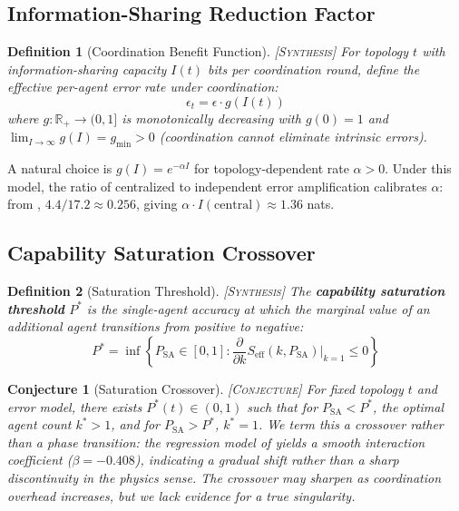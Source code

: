 \documentclass[11pt, a4paper, logo, copyright]{googledeepmind}
\newtheorem{definition}{Definition}[section]
\newtheorem{conjecture}[theorem]{Conjecture}
\newcommand{\synthesis}{\textsc{[Synthesis]}}
\newcommand{\conjectured}{\textsc{[Conjecture]}}
\begin{document}
\subsection{Information-Sharing Reduction Factor}

\begin{definition}[Coordination Benefit Function] \synthesis{}
\label{def:coord-benefit}
For topology $t$ with information-sharing capacity $I(t)$ bits per coordination round, define the effective per-agent error rate under coordination:
\begin{equation}
  \epsilon_t = \epsilon \cdot g(I(t))
\end{equation}
where $g: \mathbb{R}_+ \to (0, 1]$ is monotonically decreasing with $g(0) = 1$ and $\lim_{I \to \infty} g(I) = g_{\min} > 0$ (coordination cannot eliminate intrinsic errors).
\end{definition}

A natural choice is $g(I) = e^{-\alpha I}$ for topology-dependent rate $\alpha > 0$.
Under this model, the ratio of centralized to independent error amplification calibrates $\alpha$: from \citet{Kim2025}, $4.4/17.2 \approx 0.256$, giving $\alpha \cdot I(\mathrm{central}) \approx 1.36$ nats.

\subsection{Capability Saturation Crossover}

\begin{definition}[Saturation Threshold] \synthesis{}
\label{def:saturation}
The \textbf{capability saturation threshold} $P^*$ is the single-agent accuracy at which the marginal value of an additional agent transitions from positive to negative:
\begin{equation}
  P^* = \inf \left\{ P_{\mathrm{SA}} \in [0,1] : \frac{\partial}{\partial k} S_{\mathrm{eff}}(k, P_{\mathrm{SA}}) \Big|_{k=1} \leq 0 \right\}
\end{equation}
\end{definition}

\begin{conjecture}[Saturation Crossover] \conjectured{}
\label{conj:phase}
For fixed topology $t$ and error model, there exists $P^*(t) \in (0,1)$ such that for $P_{\mathrm{SA}} < P^*$, the optimal agent count $k^* > 1$, and for $P_{\mathrm{SA}} > P^*$, $k^* = 1$.
We term this a crossover rather than a phase transition: the regression model of \citet{Kim2025} yields a smooth interaction coefficient ($\beta = -0.408$), indicating a gradual shift rather than a sharp discontinuity in the physics sense. The crossover may sharpen as coordination overhead increases, but we lack evidence for a true singularity.
\end{conjecture}
\end{document}
